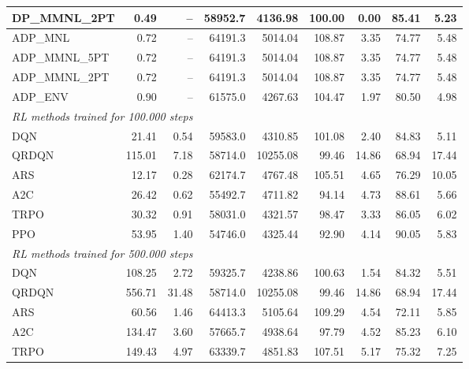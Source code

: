 \begin{samepage}
\begin{center}
\begin{tabular}{l|rr|rr|rr|rr}
    DP\_MMNL\_2PT &     0.49 &    -- &    58952.7 &    4136.98 &  100.00 &    0.00 &   85.41 &    5.23 \\
    \midrule
    ADP\_MNL     &     0.72 &    -- &    64191.3 &    5014.04 &  108.87 &    3.35 &   74.77 &    5.48 \\
    ADP\_MMNL\_5PT &     0.72 &    -- &    64191.3 &    5014.04 &  108.87 &    3.35 &   74.77 &    5.48 \\
    ADP\_MMNL\_2PT &     0.72 &    -- &    64191.3 &    5014.04 &  108.87 &    3.35 &   74.77 &    5.48 \\
    ADP\_ENV     &     0.90 &    -- &    61575.0 &    4267.63 &  104.47 &    1.97 &   80.50 &    4.98 \\
    \midrule
    \multicolumn{9}{l}{\textit{RL methods trained for 100.000 steps}} \\
    \midrule
    DQN          &    21.41 &     0.54 &    59583.0 &    4310.85 &  101.08 &    2.40 &   84.83 &    5.11 \\
    QRDQN        &   115.01 &     7.18 &    58714.0 &   10255.08 &   99.46 &   14.86 &   68.94 &   17.44 \\
    ARS          &    12.17 &     0.28 &    62174.7 &    4767.48 &  105.51 &    4.65 &   76.29 &   10.05 \\
    A2C          &    26.42 &     0.62 &    55492.7 &    4711.82 &   94.14 &    4.73 &   88.61 &    5.66 \\
    TRPO         &    30.32 &     0.91 &    58031.0 &    4321.57 &   98.47 &    3.33 &   86.05 &    6.02 \\
    PPO          &    53.95 &     1.40 &    54746.0 &    4325.44 &   92.90 &    4.14 &   90.05 &    5.83 \\
    \midrule
    \multicolumn{9}{l}{\textit{RL methods trained for 500.000 steps}} \\
    \midrule
    DQN          &   108.25 &     2.72 &    59325.7 &    4238.86 &  100.63 &    1.54 &   84.32 &    5.51 \\
    QRDQN        &   556.71 &    31.48 &    58714.0 &   10255.08 &   99.46 &   14.86 &   68.94 &   17.44 \\
    ARS          &    60.56 &     1.46 &    64413.3 &    5105.64 &  109.29 &    4.54 &   72.11 &    5.85 \\
    A2C          &   134.47 &     3.60 &    57665.7 &    4938.64 &   97.79 &    4.52 &   85.23 &    6.10 \\
    TRPO         &   149.43 &     4.97 &    63339.7 &    4851.83 &  107.51 &    5.17 &   75.32 &    7.25 \\

\end{tabular}
\end{center}
\end{samepage}
